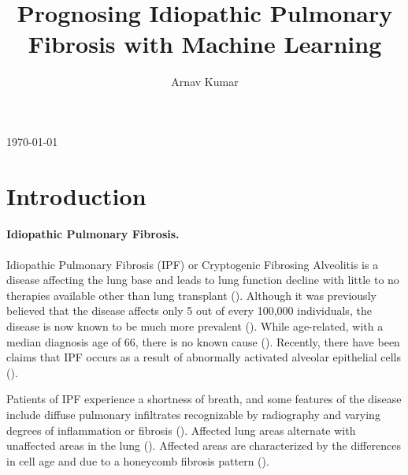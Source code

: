 \documentclass[12pt]{article}
\title{Prognosing Idiopathic Pulmonary Fibrosis with Machine Learning}
\author{Arnav Kumar}
\renewcommand{\maketitle}{
    \begin{center}
        {\Huge \thetitle}

        \vspace{0.1em}
        {\large \theauthor}

        \vspace{0.1em}
        {\large \today}
    \end{center}
}
\begin{document}
\maketitle
\thispagestyle{fancy}

\section{Introduction}

\paragraph*{Idiopathic Pulmonary Fibrosis.}

Idiopathic Pulmonary Fibrosis (IPF) or Cryptogenic Fibrosing Alveolitis is a disease affecting the lung base and leads to lung function decline with little to no therapies available other than lung transplant (\cite{mason1999pharmacological,gross2001idiopathic}). 
Although it was previously believed that the disease affects only 5 out of every 100,000 individuals, the disease is now known to be much more prevalent (\cite{coultas1994epidemiology,mason1999pharmacological,raghu2018diagnosis}). 
While age-related, with a median diagnosis age of 66, there is no known cause (\cite{king2011idiopathic,raghu2018diagnosis}).
Recently, there have been claims that IPF occurs as a result of abnormally activated alveolar epithelial cells (\cite{king2011idiopathic}).

Patients of IPF experience a shortness of breath, and some features of the disease include diffuse pulmonary infiltrates recognizable by radiography and varying degrees of inflammation or fibrosis (\cite{gross2001idiopathic}). 
Affected lung areas alternate with unaffected areas in the lung (\cite{gross2001idiopathic}).
Affected areas are characterized by the differences in cell age and due to a honeycomb fibrosis pattern (\cite{gross2001idiopathic}).
\end{document}
